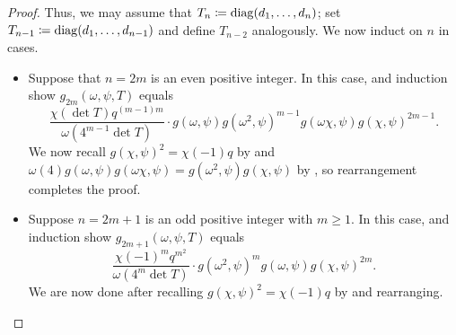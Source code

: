 \begin{proof}
    Thus, we may assume that $T_n\coloneqq\operatorname{diag}(d_1,\ldots,d_n)$; set $T_{n-1}\coloneqq\operatorname{diag}(d_1,\ldots,d_{n-1})$ and define $T_{n-2}$ analogously. We now induct on $n$ in cases.
    \begin{itemize}
        \item Suppose that $n=2m$ is an even positive integer. In this case,  and induction show $g_{2m}(\omega,\psi,T)$ equals
        \[\frac{\chi(\det T)q^{(m-1)m}}{\omega(4^{m-1}\det T)}\cdot g(\omega,\psi)g\left(\omega^2,\psi\right)^{m-1}g(\omega\chi,\psi)g(\chi,\psi)^{2m-1}.\]
        We now recall $g(\chi,\psi)^2=\chi(-1)q$ by  and $\omega(4)g(\omega,\psi)g(\omega\chi,\psi)=g\left(\omega^2,\psi\right)g(\chi,\psi)$ by , so rearrangement completes the proof.
        \item Suppose $n=2m+1$ is an odd positive integer with $m\ge1$. In this case,  and induction show $g_{2m+1}(\omega,\psi,T)$ equals
        \[\frac{\chi(-1)^mq^{m^2}}{\omega(4^m\det T)}\cdot g\left(\omega^2,\psi\right)^mg(\omega,\psi)g(\chi,\psi)^{2m}.\]
        We are now done after recalling $g(\chi,\psi)^2=\chi(-1)q$ by  and rearranging.
        \qedhere

\end{itemize}
\end{proof}
